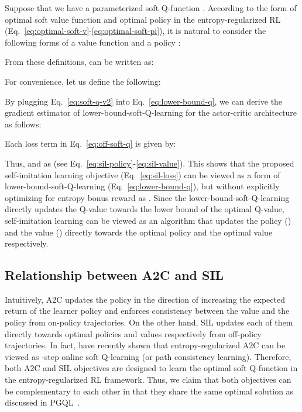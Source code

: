 \documentclass{article}
\newcommand{\cutsubsectionup}{\vspace*{-0.05in}}\newcommand{\cutsubsectiondown}{\vspace*{-0.05in}}
\begin{document}
Suppose that we have a parameterized soft Q-function . According to the form of optimal soft value function and optimal policy in the entropy-regularized RL (Eq.~\ref{eq:optimal-soft-v}-\ref{eq:optimal-soft-pi}), it is natural to consider the following forms of a value function  and a policy :

From these definitions,  can be written as:

For convenience, let us define the following: 

By plugging Eq.~\ref{eq:soft-q-v2} into Eq.~\ref{eq:lower-bound-q}, we can derive the gradient estimator of lower-bound-soft-Q-learning for the actor-critic architecture as follows:

Each loss term in Eq.~\ref{eq:off-soft-q} is given by:

Thus,  and 
 as  (see Eq.~\ref{eq:sil-policy}-\ref{eq:sil-value}). This shows that the proposed self-imitation learning objective  (Eq.~\ref{eq:sil-loss}) can be viewed as a form of lower-bound-soft-Q-learning (Eq.~\ref{eq:lower-bound-q}), but without explicitly optimizing for entropy bonus reward as .
Since the lower-bound-soft-Q-learning directly updates the Q-value towards the lower bound of the optimal Q-value, self-imitation learning can be viewed as an algorithm that updates the policy () and the value () directly towards the optimal policy and the optimal value respectively.

\cutsubsectionup
\subsection{Relationship between A2C and SIL} \label{sec:a2c-sil}
Intuitively, A2C updates the policy in the direction of increasing the expected return of the learner policy and enforces consistency between the value and the policy from on-policy trajectories. On the other hand, SIL updates each of them directly towards optimal policies and values respectively from off-policy trajectories. In fact, \citet{Nachum2017BridgingTG,Haarnoja2017ReinforcementLW,Schulman2017EquivalenceBP} have recently shown that entropy-regularized A2C can be viewed as -step online soft Q-learning (or path consistency learning). Therefore, both A2C and SIL objectives are designed to learn the optimal soft Q-function in the entropy-regularized RL framework. 
Thus, we claim that both objectives can be complementary to each other in that they share the same optimal solution as discussed in PGQL~\citep{ODonoghue2016CombiningPG}.
\end{document}
